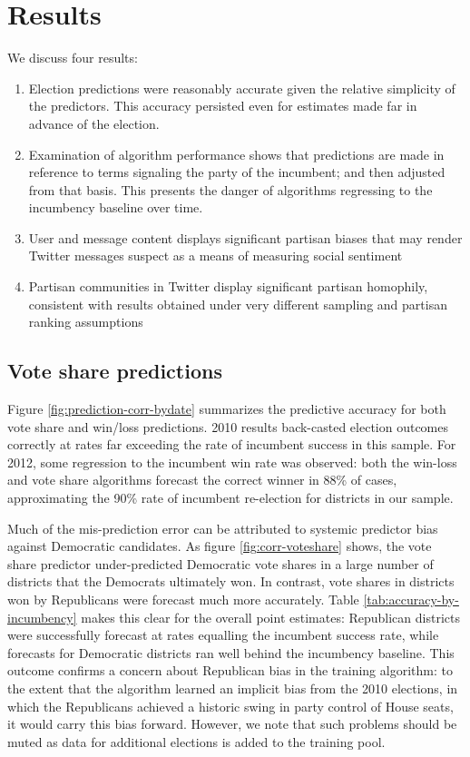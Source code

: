\documentclass{acm_proc_article-sp}
\begin{document}
\section{Results}
\label{sec:results}

We discuss four results:
\begin{enumerate}
\item Election predictions were reasonably accurate given the relative
  simplicity of the predictors. This accuracy persisted even for
  estimates made far in advance of the election.
\item Examination of algorithm performance shows that predictions are
  made in reference to terms signaling the party of the incumbent; and
  then adjusted from that basis. This presents the danger of
  algorithms regressing to the incumbency baseline over time.
\item User and message content displays significant partisan biases
  that may render Twitter messages suspect as a means of measuring
  social sentiment
\item Partisan communities in Twitter display significant partisan
  homophily, consistent with results obtained under very different
  sampling and partisan ranking assumptions
\end{enumerate}

\subsection{Vote share predictions}
\label{sec:predictions}

Figure \ref{fig:prediction-corr-bydate} summarizes the predictive
accuracy for both vote share and win/loss predictions. 2010 results
back-casted election outcomes correctly at rates far exceeding the
rate of incumbent success in this sample. For 2012, some regression to
the incumbent win rate was observed: both the win-loss and vote share
algorithms forecast the correct winner in 88\% of cases, approximating
the 90\% rate of incumbent re-election for districts in our sample.

Much of the mis-prediction error can be attributed to systemic
predictor bias against Democratic candidates. As figure
\ref{fig:corr-voteshare} shows, the vote share predictor
under-predicted Democratic vote shares in a large number of districts
that the Democrats ultimately won. In contrast, vote shares in districts
won by Republicans were forecast much more accurately. Table
\ref{tab:accuracy-by-incumbency} makes this clear for the overall
point estimates: Republican districts were successfully forecast at
rates equalling the incumbent success rate, while forecasts for
Democratic districts ran well behind the incumbency baseline. This outcome
confirms a concern about Republican bias in the training algorithm: to
the extent that the algorithm learned an implicit bias from the 2010
elections, in which the Republicans achieved a historic swing in party
control of House seats, it would carry this bias forward. However, we
note that such problems should be muted as data for additional
elections is added to the training pool. 
\end{document}
